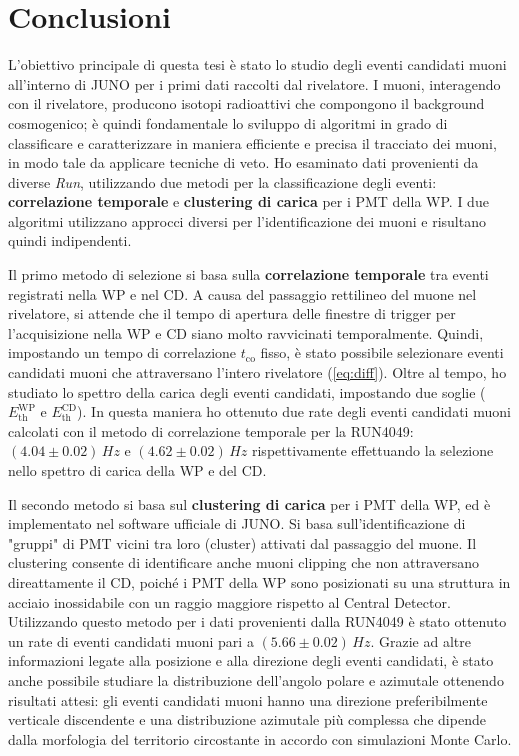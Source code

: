 \chapter*{Conclusioni}

L'obiettivo principale di questa tesi è stato lo studio degli eventi candidati muoni all'interno di JUNO per i primi dati raccolti dal rivelatore. I muoni, interagendo con il rivelatore, producono isotopi radioattivi che compongono il background cosmogenico; è quindi fondamentale lo sviluppo di algoritmi in grado di classificare e caratterizzare in maniera efficiente e precisa il tracciato dei muoni, in modo tale da applicare tecniche di veto. Ho esaminato dati provenienti da diverse \textit{Run}, utilizzando due metodi per la classificazione degli eventi: \textbf{correlazione temporale} e \textbf{clustering di carica} per i PMT della WP. I due algoritmi utilizzano approcci diversi per l'identificazione dei muoni e risultano quindi indipendenti.

Il primo metodo di selezione si basa sulla \textbf{correlazione temporale} tra eventi registrati nella WP e nel CD. A causa del passaggio rettilineo del muone nel rivelatore, si attende che il tempo di apertura delle finestre di trigger per l'acquisizione nella WP e CD siano molto ravvicinati temporalmente. Quindi, impostando un tempo di correlazione $t_\text{co}$ fisso, è stato possibile selezionare eventi candidati muoni che attraversano l'intero rivelatore (\ref{eq:diff}). Oltre al tempo, ho studiato lo spettro della carica degli eventi candidati, impostando due soglie ($E^\text{WP}_\text{th}$ e $E^\text{CD}_\text{th}$). In questa maniera ho ottenuto due rate degli eventi candidati muoni calcolati con il metodo di correlazione temporale per la RUN4049: $(4.04\pm0.02)\,\unit{Hz}$ e $(4.62\pm0.02)\,\unit{Hz}$ rispettivamente effettuando la selezione nello spettro di carica della WP e del CD.

Il secondo metodo si basa sul \textbf{clustering di carica} per i PMT della WP, ed è implementato nel software ufficiale di JUNO. Si basa sull'identificazione di "gruppi" di PMT vicini tra loro (cluster) attivati dal passaggio del muone. Il clustering consente di identificare anche muoni clipping che non attraversano direattamente il CD, poiché i PMT della WP sono posizionati su una struttura in acciaio inossidabile con un raggio maggiore rispetto al Central Detector. Utilizzando questo metodo per i dati provenienti dalla RUN4049 è stato ottenuto un rate  di eventi candidati muoni pari a $(5.66\pm0.02)\,\unit{Hz}$. Grazie ad altre informazioni legate alla posizione e alla direzione degli eventi candidati, è stato anche possibile studiare la distribuzione dell'angolo polare e azimutale ottenendo risultati attesi: gli eventi candidati muoni hanno una direzione preferibilmente verticale discendente e una distribuzione azimutale più complessa che dipende dalla morfologia del territorio circostante in accordo con simulazioni Monte Carlo.

